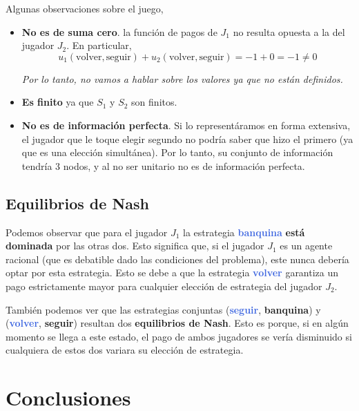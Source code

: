 \documentclass{article}
\newcommand{\stratU}[1]{\textbf{\textcolor{RoyalBlue}{#1}}}
\newcommand{\stratD}[1]{\textbf{\textcolor{RedOrange}{#1}}}
\newcommand{\strat}[2]{(\stratU{#1}, \stratD{#2})}
\begin{document}
Algunas observaciones sobre el juego,

\begin{itemize}
    \item \textbf{No es de suma cero}. la función de pagos de $J_1$ no resulta opuesta a la del jugador $J_2$. En particular,
    \[
        u_1(\text{volver}, \text{seguir}) + u_2(\text{volver}, \text{seguir})
        = -1 + 0 = -1 \neq 0
    \]

    \textit{Por lo tanto, no vamos a hablar sobre los valores ya que no están definidos.}
    \item \textbf{Es finito} ya que $S_1$ y $S_2$ son finitos.
    \item \textbf{No es de información perfecta}. Si lo representáramos en forma extensiva, el jugador que le toque elegir segundo no podría saber que hizo el primero (ya que es una elección simultánea). Por lo tanto, su conjunto de información tendría 3 nodos, y al no ser unitario no es de información perfecta.
\end{itemize}

\subsection*{Equilibrios de Nash}

Podemos observar que para el jugador $J_1$ la estrategia \stratU{banquina} \textbf{está dominada} por las otras dos. Esto significa que, si el jugador $J_1$ es un agente racional (que es debatible dado las condiciones del problema), este nunca debería optar por esta estrategia. Esto se debe a que la estrategia \stratU{volver} garantiza un pago estrictamente mayor para cualquier elección de estrategia del jugador $J_2$.

También podemos ver que las estrategias conjuntas \strat{seguir}{banquina} y \strat{volver}{seguir} resultan dos \textbf{equilibrios de Nash}. Esto es porque, si en algún momento se llega a este estado, el pago de ambos jugadores se vería disminuido si cualquiera de estos dos variara su elección de estrategia.

\section*{Conclusiones}
\end{document}
